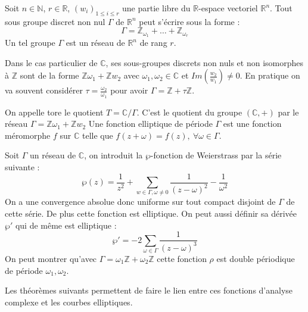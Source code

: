 \documentclass[12pt]{article}
\begin{document}
\begin{prop}
Soit $n \in \mathbb{N}$, $r \in \mathbb{R}$, $(w_i)_{1 \leq i \leq r}$ une partie libre du $\mathbb{R}$-espace vectoriel $\mathbb{R}^n$. Tout sous groupe discret non nul $\Gamma$ de $\mathbb{R}^n$ peut s'écrire sous la forme :
\begin{equation*}
\Gamma = \mathbb{Z}_{\omega_1} + \ldots + \mathbb{Z}_{\omega_r}
\end{equation*}
Un tel groupe $\Gamma$ est un réseau de $\mathbb{R}^n$ de rang $r$.
\end{prop}
Dans le cas particulier de $\mathbb{C}$, ses sous-groupes discrets non nuls et non isomorphes à $\mathbb{Z}$ sont de la forme $\mathbb{Z}\omega_1 + \mathbb{Z}w_2$ avec $\omega_1, \omega_2 \in \mathbb{C}$ et $Im(\frac{w_2}{w_1}) \ne 0$. En pratique on va souvent considérer $\tau = \frac{\omega_2}{\omega_1}$ pour avoir $\Gamma = \mathbb{Z} + \tau \mathbb{Z}$.

\begin{defi}
On appelle tore le quotient $T = \mathbb{C}/ \Gamma$. C'est le quotient du groupe $(\mathbb{C}, +)$ par le réseau $\Gamma = \mathbb{Z}\omega_1 + \mathbb{Z}w_2$
\newline
Une fonction elliptique de période $\Gamma$ est une fonction méromorphe $f$ sur $\mathbb{C}$ telle que $f(z + \omega) = f(z) ,\ \forall \omega \in \Gamma$.
\end{defi}

\begin{defi}
Soit $\Gamma$ un réseau de $\mathbb{C}$, on introduit la $\wp$-fonction de Weierstrass par la série suivante :
\begin{equation*}
\wp(z) = \frac{1}{z^2} + \sum_{w \in \Gamma, \omega \ne 0} \frac{1}{(z-\omega)^2} - \frac{1}{\omega^2}
\end{equation*}
On a une convergence absolue donc uniforme sur tout compact disjoint de $\Gamma$ de cette série. De plus cette fonction est elliptique. On peut aussi définir sa dérivée ${\wp'}$ qui de même est elliptique :
\begin{equation*}
{\wp'} = -2 \sum_{\omega \in \Gamma} \frac{1}{(z-\omega)^3}
\end{equation*}
On peut montrer qu'avec $\Gamma = \omega_1 \mathbb{Z} + \omega_2 \mathbb{Z}$ cette fonction $\rho$ est double périodique de période $\omega_1, \omega_2$.
\end{defi}

Les théorèmes suivants permettent de faire le lien entre ces fonctions d'analyse complexe et les courbes elliptiques.
\end{document}
